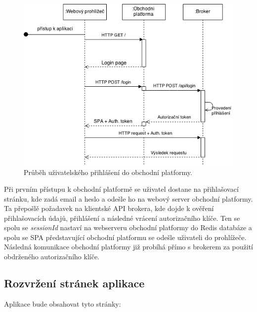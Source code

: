 \documentclass[thesis=M,czech]{FITthesis}[2012/06/26]
\begin{document}
\begin{figure}[h]
	\centering
	\includegraphics[width=1\textwidth]{images/client_login}
 	\caption[Průběh přihlášení uživatele do obchodní platformy]{Průběh uživatelského přihlášení do obchodní platformy.}
 	\label{fig:client_login}
\end{figure}
	
	Při prvním přístupu k obchodní platformě se uživatel dostane na přihlašovací stránku, kde zadá email a heslo a odešle ho na webový server obchodní platformy. Ta přepošlě požadavek na klientské API brokera, kde dojde k ověření přihlašovacích údajů, přihlášení a následné vrácení autorizačního klíče. Ten se spolu se \textit{sessionId} nastaví na webserveru obchodní platformy do Redis databáze a spolu se SPA představující obchodní platformu se odešle uživateli do prohlížeče. Následná komunikace obchodní platformy již probíhá přímo s brokerem za použití obdrženého autorizačního klíče.
	
	
\subsection{Rozvržení stránek aplikace}
	
	Aplikace bude obsahovat tyto stránky:
\end{document}
